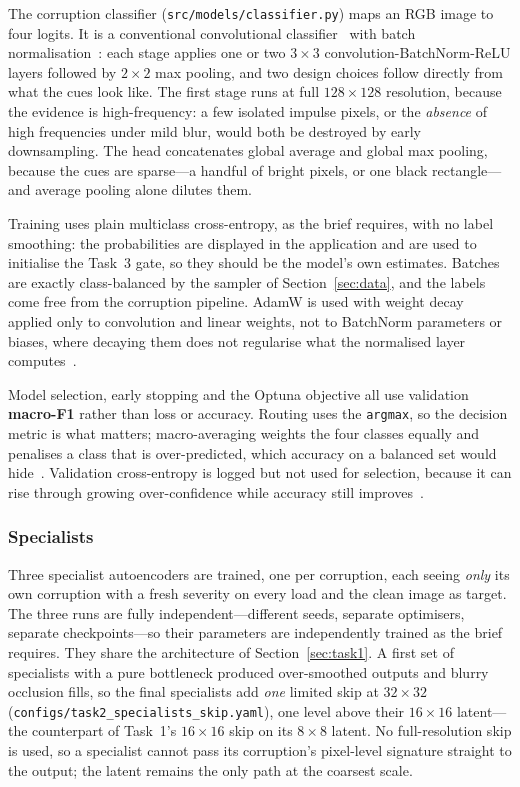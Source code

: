 \documentclass[conference]{IEEEtran}
\begin{document}
The corruption classifier (\texttt{src/models/classifier.py}) maps an RGB image
to four logits. It is a conventional convolutional
classifier~\cite{lecun1998gradient,he2016deep} with batch
normalisation~\cite{ioffe2015batch}: each stage applies one or two $3\times3$
convolution-BatchNorm-ReLU layers followed by $2\times2$ max pooling, and two
design choices follow directly from what the cues look like. The first stage runs
at full $128\times128$ resolution, because the evidence is high-frequency: a
few isolated impulse pixels, or the \emph{absence} of high frequencies under mild
blur, would both be destroyed by early downsampling. The head concatenates global
average and global max pooling, because the cues are sparse---a handful of bright
pixels, or one black rectangle---and average pooling alone dilutes them.

Training uses plain multiclass cross-entropy, as the brief requires, with no
label smoothing: the probabilities are displayed in the application and are used
to initialise the Task~3 gate, so they should be the model's own estimates.
Batches are exactly class-balanced by the sampler of Section~\ref{sec:data}, and
the labels come free from the corruption pipeline. AdamW is used with weight
decay applied only to convolution and linear weights, not to BatchNorm
parameters or biases, where decaying them does not regularise what the
normalised layer computes~\cite{he2019bag}.

Model selection, early stopping and the Optuna objective all use validation
\textbf{macro-F1} rather than loss or accuracy. Routing uses the \texttt{argmax},
so the decision metric is what matters; macro-averaging weights the four classes
equally and penalises a class that is over-predicted, which accuracy on a
balanced set would hide~\cite{sokolova2009systematic}. Validation cross-entropy
is logged but not used for selection, because it can rise through growing
over-confidence while accuracy still improves~\cite{guo2017calibration}.

\subsubsection{Specialists}

Three specialist autoencoders are trained, one per corruption, each seeing
\emph{only} its own corruption with a fresh severity on every load and the clean
image as target. The three runs are fully independent---different seeds, separate
optimisers, separate checkpoints---so their parameters are independently trained
as the brief requires. They share the architecture of Section~\ref{sec:task1}.
A first set of specialists with a pure bottleneck produced over-smoothed outputs and
blurry occlusion fills, so the final specialists add \emph{one} limited skip at
$32\times32$ (\texttt{configs/task2\_specialists\_skip.yaml}), one level above
their $16\times16$ latent---the counterpart of Task~1's $16\times16$ skip on its
$8\times8$ latent. No full-resolution skip is used, so a specialist cannot pass its
corruption's pixel-level signature straight to the output; the latent remains the
only path at the coarsest scale.
\end{document}
